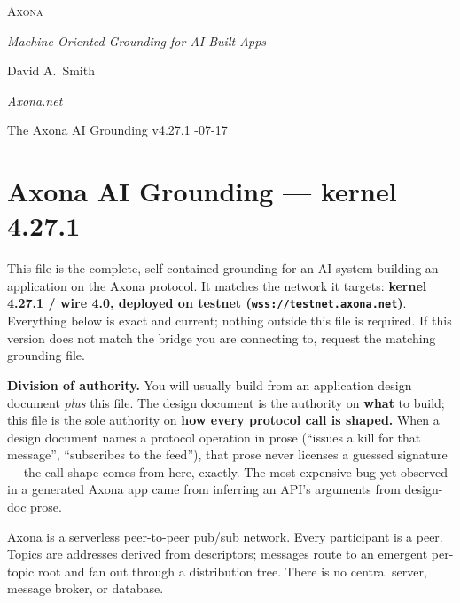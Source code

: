 \documentclass[
  nobib]{tufte-handout}
\author{}
\date{}
\begin{document}
\thispagestyle{empty}
\null\vfill
\begin{center}
{\fontsize{48}{52}\selectfont \textsc{Axona}\par}
\vspace{0.6em}
{\Large\itshape Machine-Oriented Grounding for AI-Built Apps\par}
\vspace{4em}
{\large David A.~Smith\par}
{\itshape\small Axona.net\par}
\vspace{2em}
{\small The Axona AI Grounding \quad v4.27.1 -07-17\par}
\end{center}
\vfill
\null
\newpage
\pagestyle{ndhtplain}
\thispagestyle{ndhtplain}
\setcounter{page}{1}

\section{Axona AI Grounding --- kernel
4.27.1}\label{axona-ai-grounding-kernel-4.27.1}

This file is the complete, self-contained grounding for an AI system
building an application on the Axona protocol. It matches the network it
targets: \textbf{kernel 4.27.1 / wire 4.0, deployed on testnet
(\texttt{wss://testnet.axona.net})}. Everything below is exact and
current; nothing outside this file is required. If this version does not
match the bridge you are connecting to, request the matching grounding
file.

\textbf{Division of authority.} You will usually build from an
application design document \emph{plus} this file. The design document
is the authority on \textbf{what} to build; this file is the sole
authority on \textbf{how every protocol call is shaped.} When a design
document names a protocol operation in prose (``issues a kill for that
message'', ``subscribes to the feed''), that prose never licenses a
guessed signature --- the call shape comes from here, exactly. The most
expensive bug yet observed in a generated Axona app came from inferring
an API's arguments from design-doc prose.

Axona is a serverless peer-to-peer pub/sub network. Every participant is
a peer. Topics are addresses derived from descriptors; messages route to
an emergent per-topic root and fan out through a distribution tree.
There is no central server, message broker, or database.
\end{document}

